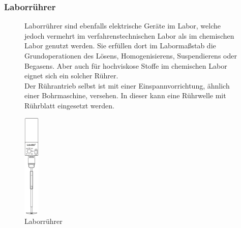 \subsubsection*{Laborrührer}
\begin{figure}[h!]
	\begin{minipage}[t]{0.65\textwidth}
		\vspace{0pt}
		Laborrührer sind ebenfalls elektrische Geräte im Labor, welche jedoch vermehrt im verfahrenstechnischen Labor als im chemischen Labor genutzt werden. Sie erfüllen dort im Labormaßstab die Grundoperationen des Lösens, Homogenisierens, Suspendierens oder Begasens. Aber auch für hochviskose Stoffe im chemischen Labor eignet sich ein solcher Rührer.\\
		Der Rührantrieb selbst ist mit einer Einspannvorrichtung, ähnlich einer Bohrmaschine, versehen. In dieser kann eine Rührwelle mit Rührblatt eingesetzt werden.
	\end{minipage}
	\hfill
	\hspace{1mm}
	\begin{minipage}[t]{0.3\textwidth}
		\vspace{0pt}
		\centering
		\includegraphics[height=5cm]{img/laborruehrer}
		\caption{Laborrührer}
		\label{fig:laborruehrer}
	\end{minipage}
\end{figure}
\FloatBarrier


